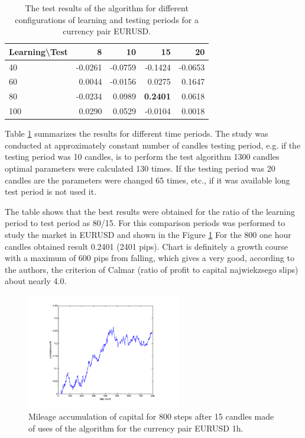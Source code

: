 \documentclass[runningheads,a4paper]{llncs}
\begin{document}
\begin{table}[h!]
\centering
\caption{The test results of the algorithm for different configurations of learning and testing periods for a currency pair EURUSD.}
\label{tab:tab1}
\begin{tabular}{|l|r|r|r|r|} \hline
Learning\textbackslash Test &	8	 &	10 &		15	 &	20 \\ \hline
40 &		-0.0261 &		-0.0759	 &	-0.1424	 &	-0.0653 \\ \hline
60 &		0.0044 &		-0.0156 &		0.0275 &		0.1647 \\ \hline
80 &		-0.0234 &		0.0989 &		\textbf{0.2401} &		0.0618 \\ \hline
100	 &	0.0290 &		0.0529 &		-0.0104	 &	0.0018 \\ \hline
\end{tabular}
\end{table}
\FloatBarrier
Table \ref{tab:tab1} summarizes the results for different time periods. The study was conducted at approximately constant number of candles testing period, e.g. if the testing period was 10 candles, is to perform the test algorithm 1300 candles optimal parameters were calculated 130 times. If the testing period was 20 candles are the parameters were changed 65 times, etc., if it was available long test period is not used it.

The table shows that the best results were obtained for the ratio of the learning period to test period as 80/15. For this comparison periods was performed to study the market in EURUSD and shown in the Figure \ref{fig:fig8} For the 800 one hour candles obtained result 0.2401 (2401 pips). Chart is definitely a growth course with a maximum of 600 pips from falling, which gives a very good, according to the authors, the criterion of Calmar (ratio of profit to capital najwiekzsego slips) about nearly 4.0.\\

\begin{figure}[h!]
\centering
\includegraphics[width = 0.6\textwidth]{figures/rys8.png}
\caption{Mileage accumulation of capital for 800 steps after 15 candles made of uses of the algorithm for the currency pair EURUSD 1h.}
\label{fig:fig8}
\end{figure}
\FloatBarrier
\end{document}
